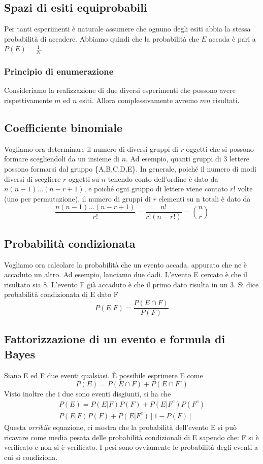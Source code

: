 \documentclass[11pt]{article}
\begin{document}
\subsection{Spazi di esiti equiprobabili}
Per tanti esperimenti è naturale assumere che ognuno degli esiti abbia la stessa probabilità di accadere. Abbiamo quindi che la probabilità che $E$ accada è pari a $P(E)=\frac{1}{N}$.
\subsubsection{Principio di enumerazione}
Consideriamo la realizzazione di due diversi esperimenti che possono avere rispettivamente $m$ ed $n$ esiti. Allora complessivamente avremo $mn$ risultati.
\subsection{Coefficiente binomiale}
Vogliamo ora determinare il numero di diversi gruppi di $r$ oggetti che si possono formare scegliendoli da un insieme di $n$. Ad esempio, quanti gruppi di 3 lettere possono formarsi dal gruppo \{A,B,C,D,E\}. In generale, poiché il numero di modi diversi di scegliere $r$ oggetti su $n$ tenendo conto dell'ordine è dato da $n(n-1)...(n-r+1)$, e poiché ogni gruppo di lettere viene contato $r!$ volte (uno per permutazione), il numero di gruppi di $r$ elementi su n totali è dato da
\begin{displaymath}
    \frac{n(n-1)...(n-r+1)}{r!} = \frac{n!}{r!(n-r!)} = {n\choose r}
\end{displaymath}
\subsection{Probabilità condizionata}
Vogliamo ora calcolare la probabilità che un evento accada, appurato che ne è accaduto un altro. Ad esempio, lanciamo due dadi. L'evento E cercato è che il risultato sia 8. L'evento F già accaduto è che il primo dato risulta in un 3. Si dice probabilità condizionata di E dato F
\begin{displaymath}
    P(E|F) = \frac{P(E\cap F)}{P(F)}
\end{displaymath}
\subsection{Fattorizzazione di un evento e formula di Bayes}
Siano E ed F due eventi qualsiasi. È possibile esprimere E come
\begin{displaymath}
    P(E) = P(E\cap F) + P(E\cap F^c)
\end{displaymath}
Visto inoltre che i due sono eventi disgiunti, si ha che
\begin{gather*}
    P(E) = P(E|F)P(F) + P(E|F^c)P(F^c)\\
    P(E|F)P(F) + P(E|F^c)[1-P(F)]
\end{gather*}
Questa \textit{orribile} equazione, ci mostra che la probabilità dell'evento E si può ricavare come media pesata delle probabilità condizionali di E sapendo che: F si è verificato e non si è verificato. I pesi sono ovviamente le probabilità degli eventi a cui si condiziona.
\end{document}
